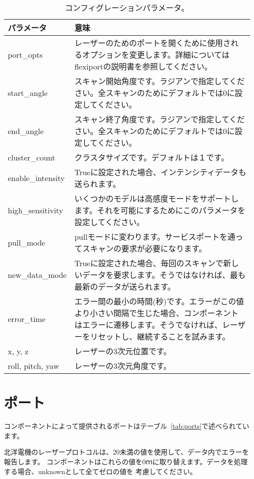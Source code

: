\documentclass[a4paper,10pt]{article}
\newenvironment{Japanese}{%
  \CJKfamily{min}%
  \CJKtilde
  \CJKnospace}{}
\begin{document}
\begin{CJK}{UTF8}{}
\begin{Japanese}
\begin{table}[t]
  \centering
  \begin{tabularx}{\columnwidth}{lX}
    \toprule
    パラメータ & 意味 \\
    \midrule
    port\_opts & レーザーのためのポートを開くために使用されるオプションを変更します。詳細についてはflexiportの説明書を参照してください。 \\
    start\_angle & スキャン開始角度です。ラジアンで指定してください。全スキャンのためにデフォルトでは0に設定してください。 \\
    end\_angle & スキャン終了角度です。ラジアンで指定してください。全スキャンのためにデフォルトでは0に設定してください。 \\
    cluster\_count & クラスタサイズです。デフォルトは１です。 \\
    enable\_intensity & Trueに設定された場合、インテンシティデータも送られます。 \\
    high\_sensitivity & いくつかのモデルは高感度モードをサポートします。それを可能にするためにこのパラメータを設定してください。 \\
    pull\_mode & pullモードに変わります。サービスポートを通ってスキャンの要求が必要になります。 \\
    new\_data\_mode & Trueに設定された場合、毎回のスキャンで新しいデータを要求します。そうではなければ、最も最新のデータが送られます。 \\
    error\_time & エラー間の最小の時間(秒)です。エラーがこの値より小さい間隔で生じた場合、コンポーネントはエラーに遷移します。そうでなければ、レーザーをリセットし、継続することを試みます。 \\
    x, y, z & レーザーの3次元位置です。 \\
    roll, pitch, yaw & レーザーの3次元角度です。 \\
    \bottomrule
  \end{tabularx}
  \caption{コンフィグレーションパラメータ。}
  \label{tab:config_params}
\end{table}

\section{ポート}
\label{sec:port}

コンポーネントによって提供されるポートはテーブル~\ref{tab:ports}で述べられています。

北洋電機のレーザープロトコルは、20未満の値を使用して、データ内でエラーを報告します。
コンポーネントはこれらの値を0ｍに取り替えます。データを処理する場合、unknownとして全てゼロの値を
考慮してください。


\end{Japanese}
\end{CJK}
\end{document}
